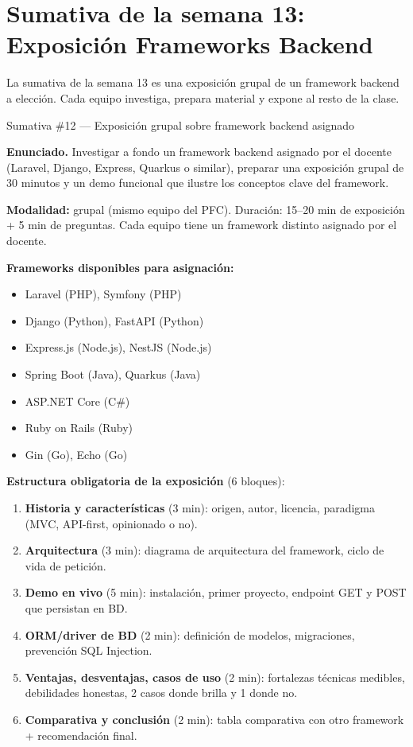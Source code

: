 \documentclass[11pt,a4paper,openany]{book}
\begin{document}
\section{Sumativa de la semana 13: Exposición Frameworks Backend}

La sumativa de la semana 13 es una exposición grupal de un
framework backend a elección. Cada equipo investiga, prepara
material y expone al resto de la clase.


\begin{cajaejercicio}{Sumativa \#12 --- Exposición grupal sobre framework backend asignado}


\textbf{Enunciado.} Investigar a fondo un framework backend asignado por el docente (Laravel, Django, Express, Quarkus o similar), preparar una exposición grupal de 30 minutos y un demo funcional que ilustre los conceptos clave del framework.

\textbf{Modalidad:} grupal (mismo equipo del PFC). Duración: 15--20
min de exposición + 5 min de preguntas. Cada equipo tiene un
framework distinto asignado por el docente.

\textbf{Frameworks disponibles para asignación:}
\begin{itemize}
\item Laravel (PHP), Symfony (PHP)
\item Django (Python), FastAPI (Python)
\item Express.js (Node.js), NestJS (Node.js)
\item Spring Boot (Java), Quarkus (Java)
\item ASP.NET Core (C\#)
\item Ruby on Rails (Ruby)
\item Gin (Go), Echo (Go)
\end{itemize}

\textbf{Estructura obligatoria de la exposición} (6 bloques):

\begin{enumerate}
\item \textbf{Historia y características} (3 min): origen, autor,
licencia, paradigma (MVC, API-first, opinionado o no).
\item \textbf{Arquitectura} (3 min): diagrama de arquitectura del
framework, ciclo de vida de petición.
\item \textbf{Demo en vivo} (5 min): instalación, primer proyecto,
endpoint GET y POST que persistan en BD.
\item \textbf{ORM/driver de BD} (2 min): definición de modelos,
migraciones, prevención SQL Injection.
\item \textbf{Ventajas, desventajas, casos de uso} (2 min):
fortalezas técnicas medibles, debilidades honestas, 2 casos donde
brilla y 1 donde no.
\item \textbf{Comparativa y conclusión} (2 min): tabla comparativa
con otro framework + recomendación final.
\end{enumerate}


\end{cajaejercicio}
\end{document}

